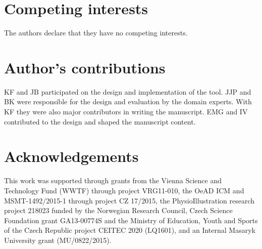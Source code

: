 \documentclass[twocolumn]{bmcart}%
\begin{document}
\begin{backmatter}

\section*{Competing interests}
  The authors declare that they have no competing interests.

\section*{Author's contributions}
KF and JB participated on the design and implementation of the tool.
JJP and BK were responsible for the design and evaluation by the domain
experts. With KF they were also major contributors in writing the
manuscript. EMG and IV contributed to the design and shaped the manuscript
content.

\section*{Acknowledgements}
This work was supported through grants from the Vienna Science and Technology Fund (WWTF) through project VRG11-010, the OeAD ICM and MSMT-1492/2015-1 through project CZ 17/2015, the PhysioIllustration research project 218023 funded by the Norwegian Research Council,  Czech Science Foundation grant GA13-00774S and the Ministry of Education, Youth and Sports of the Czech Republic project CEITEC 2020 (LQ1601), and an Internal Masaryk University grant (MU/0822/2015).



\end{backmatter}
\end{document}
